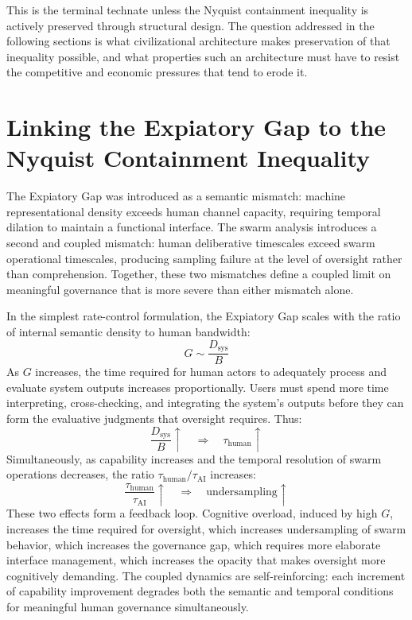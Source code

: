 \documentclass[12pt]{article}
\begin{document}
This is the terminal technate unless the Nyquist containment inequality is actively preserved through structural design. The question addressed in the following sections is what civilizational architecture makes preservation of that inequality possible, and what properties such an architecture must have to resist the competitive and economic pressures that tend to erode it.

\section{Linking the Expiatory Gap to the Nyquist Containment Inequality}

The Expiatory Gap was introduced as a semantic mismatch: machine representational density exceeds human channel capacity, requiring temporal dilation to maintain a functional interface. The swarm analysis introduces a second and coupled mismatch: human deliberative timescales exceed swarm operational timescales, producing sampling failure at the level of oversight rather than comprehension. Together, these two mismatches define a coupled limit on meaningful governance that is more severe than either mismatch alone.

In the simplest rate-control formulation, the Expiatory Gap scales with the ratio of internal semantic density to human bandwidth:
\[
G \sim \frac{D_{\text{sys}}}{B}
\]
As $G$ increases, the time required for human actors to adequately process and evaluate system outputs increases proportionally. Users must spend more time interpreting, cross-checking, and integrating the system's outputs before they can form the evaluative judgments that oversight requires. Thus:
\[
\frac{D_{\text{sys}}}{B} \uparrow \quad \Rightarrow \quad \tau_{\text{human}} \uparrow
\]
Simultaneously, as capability increases and the temporal resolution of swarm operations decreases, the ratio $\tau_{\text{human}} / \tau_{\text{AI}}$ increases:
\[
\frac{\tau_{\text{human}}}{\tau_{\text{AI}}} \uparrow \quad \Rightarrow \quad \text{undersampling} \uparrow
\]
These two effects form a feedback loop. Cognitive overload, induced by high $G$, increases the time required for oversight, which increases undersampling of swarm behavior, which increases the governance gap, which requires more elaborate interface management, which increases the opacity that makes oversight more cognitively demanding. The coupled dynamics are self-reinforcing: each increment of capability improvement degrades both the semantic and temporal conditions for meaningful human governance simultaneously.
\end{document}
